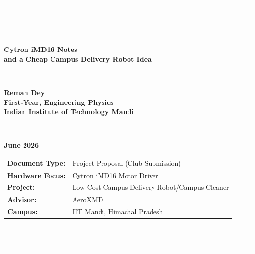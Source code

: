 \documentclass[12pt,a4paper]{article}
\begin{document}
\begin{titlepage}
    \centering
    \vspace*{1cm}
    {\color{iitmBlue}\rule{\linewidth}{2pt}}\\[0.4cm]
    {\color{iitmBlue}\rule{\linewidth}{0.5pt}}\\[1.2cm]

    {\Huge\bfseries\color{iitmBlue}
        Cytron iMD16 Notes\\[0.3em]
        and a Cheap Campus Delivery Robot Idea
    }\\[0.8cm]

    {\color{iitmGold}\rule{0.6\linewidth}{1pt}}\\[0.6cm]

    {\normalsize
        \textbf{\color{iitmBlue}Reman Dey}\\[0.2em]
        \textbf{\color{iitmBlue}First-Year, Engineering Physics}\\[0.2em]
        \textbf{\color{iitmBlue}Indian Institute of Technology Mandi}\\[0.2em]
    }

    {\color{iitmGold}\rule{0.4\linewidth}{0.5pt}}\\[0.6cm]

    {\large\bfseries June 2026}\\[1.5cm]

    \begin{tabular}{ll}
        \textbf{Document Type:}   & Project Proposal (Club Submission) \\
        \textbf{Hardware Focus:}  & Cytron iMD16 Motor Driver \\[4pt]
        \textbf{Project:}   & Low-Cost Campus Delivery Robot/Campus Cleaner \\[4pt]
        \textbf{Advisor:}         & AeroXMD \\
        \textbf{Campus:}          & IIT Mandi, Himachal Pradesh  \\
    \end{tabular}

    \vfill
    {\color{iitmBlue}\rule{\linewidth}{0.5pt}}\\[0.3cm]
    {\color{iitmBlue}\rule{\linewidth}{2pt}}
\end{titlepage}

\newpage
\tableofcontents
\newpage
\end{document}
